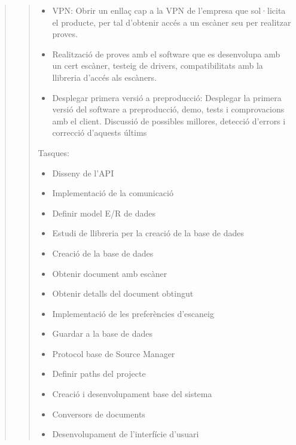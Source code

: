 \documentclass[letterpaper,11pt,catalan]{sphinxmanual}
\begin{document}
\begin{quote}
\begin{quote}
\begin{itemize}
\item {} 
VPN: Obrir un enllaç cap a la VPN de l'empresa que sol·licita el producte, per tal d'obtenir
accés a un escàner seu per realitzar proves.

\item {} 
Realització de proves amb el software que es desenvolupa amb un cert escàner, testeig de drivers,
compatibilitats amb la llibreria d'accés als escàners.

\item {} 
Desplegar primera versió a preproducció: Desplegar la primera versió del software a preproducció,
demo, tests i comprovacions amb el client. Discussió de possibles millores, detecció d'errors i
correcció d'aquests últims

\end{itemize}

Tasques:
\begin{itemize}
\item {} 
Disseny de l'API

\item {} 
Implementació de la comunicació

\item {} 
Definir model E/R de dades

\item {} 
Estudi de llibreria per la creació de la base de dades

\item {} 
Creació de la base de dades

\item {} 
Obtenir document amb escàner

\item {} 
Obtenir detalls del document obtingut

\item {} 
Implementació de les preferències d'escaneig

\item {} 
Guardar a la base de dades

\item {} 
Protocol base de Source Manager

\item {} 
Definir paths del projecte

\item {} 
Creació i desenvolupament base del sistema

\item {} 
Conversors de documents

\item {} 
Desenvolupament de l'interfície d'usuari


\end{itemize}
\end{quote}
\end{quote}
\end{document}
